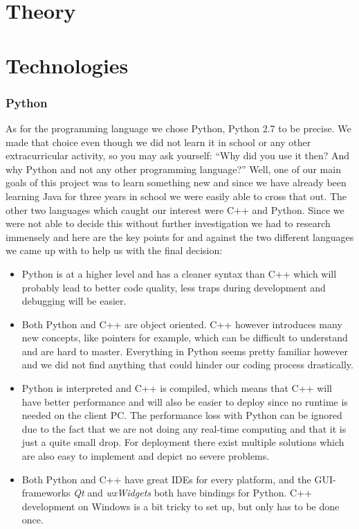 \section{Theory}
\def\kapitelautor{Christoph Führer}

\section{Technologies}
\def\kapitelautor{Christoph Führer}
\subsubsection{Python}
As for the programming language we chose Python, Python 2.7 to be precise. We made that choice even though we did not learn it in school or any other extracurricular activity, so you may ask yourself: ``Why did you use it then? And why Python and not any other programming language?'' Well, one of our main goals of this project was to learn something new and since we have already been learning Java for three years in school we were easily able to cross that out. The other two languages which caught our interest were C++ and Python. Since we were not able to decide this without further investigation we had to research immensely and here are the key points for and against the two different languages we came up with to help us with the final decision:


\begin{itemize}
	\item Python is at a higher level and has a cleaner syntax than C++ which will probably lead to better code quality, less traps during development and debugging will be easier.
	\item Both Python and C++ are object oriented. C++ however introduces many new concepts, like pointers for example, which can be difficult to understand and are hard to master. Everything in Python seems pretty familiar however and we did not find anything that could hinder our coding process drastically.
	\item Python is interpreted and C++ is compiled, which means that C++ will have better performance and will also be easier to deploy since no runtime is needed on the client PC. The performance loss with Python can be ignored due to the fact that we are not doing any real-time computing and that it is just a quite small drop. For deployment there exist multiple solutions which are also easy to implement and depict no severe problems.
	\item Both Python and C++ have great IDEs for every platform, and the GUI-frameworks \emph{Qt} and \emph{wxWidgets} both have bindings for Python. C++ development on Windows is a bit tricky to set up, but only has to be done once.
\end{itemize}

